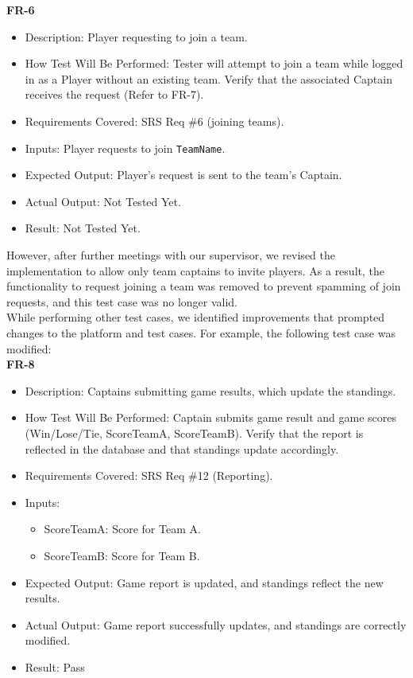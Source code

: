 \documentclass[12pt, titlepage]{article}
\begin{document}
   \textbf{FR-6}  
      \begin{itemize}
          \item Description: Player requesting to join a team.
          \item How Test Will Be Performed: Tester will attempt to join a team while logged in as a Player without an existing team. Verify that the associated Captain receives the request (Refer to FR-7).
          \item Requirements Covered: SRS Req \#6 (joining teams).
          \item Inputs: Player requests to join \texttt{TeamName}.
          \item Expected Output: Player’s request is sent to the team’s Captain.
          \item Actual Output: Not Tested Yet.
          \item Result: Not Tested Yet.
      \end{itemize}

However, after further meetings with our supervisor, we revised the implementation to allow only team captains to invite players. As a result, the functionality to request joining a team was removed to prevent spamming of join requests, and this test case was no longer valid. \\


While performing other test cases, we identified improvements that prompted changes to the platform and test cases. For example, the following test case was modified:\\

 \textbf{FR-8}  
      \begin{itemize}
          \item Description: Captains submitting game results, which update the standings.
          \item How Test Will Be Performed: Captain submits game result and game scores (Win/Lose/Tie, ScoreTeamA, ScoreTeamB). Verify that the report is reflected in the database and that standings update accordingly.
          \item Requirements Covered: SRS Req \#12 (Reporting).
          \item Inputs:  
              \begin{itemize} 
                  \item ScoreTeamA: Score for Team A.  
                  \item ScoreTeamB: Score for Team B.  
              \end{itemize}
          \item Expected Output: Game report is updated, and standings reflect the new results.
          \item Actual Output: Game report successfully updates, and standings are correctly modified.
          \item Result: Pass
      \end{itemize}
\end{document}
